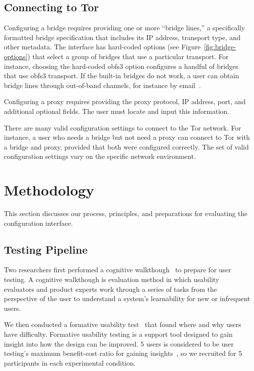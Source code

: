 \documentclass[USenglish,oneside,twocolumn]{article}
\begin{document}
\subsection{Connecting to Tor} 
Configuring a bridge requires providing one or more
``bridge lines,'' a specifically formatted bridge specification that
includes its IP address, transport type, and other metadata.
The interface has hard-coded options (see Figure~\ref{fig:bridge-options}) 
that select a group of bridges that use a particular transport.
For instance, choosing the hard-coded obfs3 option
configures a handful of bridges that use obfs3 transport.
If the built-in bridges do not work, a user can obtain bridge lines
through out-of-band channels, for instance by email~\cite{bridgedb}.

Configuring a proxy requires providing the proxy protocol, IP address, port, and additional optional fields. The user must locate and input this information. 

There are many valid configuration settings to connect to the Tor network.
For instance, a user who needs a bridge but not need a proxy can connect to Tor with a bridge and proxy, provided that both were configured correctly. The set of valid configuration settings vary on the specific network environment. 

\section{Methodology} 
This section discusses our process, principles, and preparations for evaluating the configuration interface.

\subsection{Testing Pipeline} 
Two researchers first performed a cognitive walkthough~\cite{cognitive-walkthrough} to prepare for user testing. A cognitive walkthough is evaluation method in which usability evaluators and product experts work through a series of tasks from the perspective of the user to understand a system's learnability for new or infrequent users.

We then conducted a formative usability test~\cite{formative} that found where and why users have difficulty. Formative usability testing is a support tool designed to gain insight into how the design can be improved. 5 users is considered to be user testing's maximum benefit-cost ratio for gaining insights~\cite{howmanyusers}, so we recruited for 5 participants in each experimental condition. 
\end{document}
